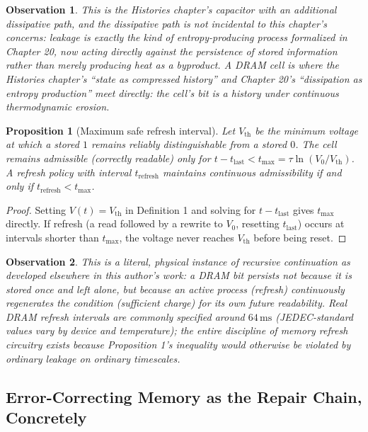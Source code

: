 \documentclass[12pt]{article}
\newtheorem{proposition}{Proposition}
\newtheorem{observation}{Observation}
\begin{document}
\begin{observation}
This is the Histories chapter's capacitor with an additional dissipative path, and the dissipative path is not incidental to this chapter's concerns: leakage is exactly the kind of entropy-producing process formalized in Chapter 20, now acting directly against the persistence of stored information rather than merely producing heat as a byproduct. A DRAM cell is where the Histories chapter's ``state as compressed history'' and Chapter 20's ``dissipation as entropy production'' meet directly: the cell's bit is a history under continuous thermodynamic erosion.
\end{observation}

\begin{proposition}[Maximum safe refresh interval]
Let $V_{\text{th}}$ be the minimum voltage at which a stored $1$ remains reliably distinguishable from a stored $0$. The cell remains admissible (correctly readable) only for $t - t_{\text{last}} < t_{\max} = \tau \ln(V_0/V_{\text{th}})$. A refresh policy with interval $t_{\text{refresh}}$ maintains continuous admissibility if and only if $t_{\text{refresh}} < t_{\max}$.
\end{proposition}

\begin{proof}
Setting $V(t) = V_{\text{th}}$ in Definition 1 and solving for $t - t_{\text{last}}$ gives $t_{\max}$ directly. If refresh (a read followed by a rewrite to $V_0$, resetting $t_{\text{last}}$) occurs at intervals shorter than $t_{\max}$, the voltage never reaches $V_{\text{th}}$ before being reset.
\end{proof}

\begin{observation}
This is a literal, physical instance of recursive continuation as developed elsewhere in this author's work: a DRAM bit persists not because it is stored once and left alone, but because an active process (refresh) continuously regenerates the condition (sufficient charge) for its own future readability. Real DRAM refresh intervals are commonly specified around $64\,\text{ms}$ (JEDEC-standard values vary by device and temperature); the entire discipline of memory refresh circuitry exists because Proposition 1's inequality would otherwise be violated by ordinary leakage on ordinary timescales.
\end{observation}

\subsection{Error-Correcting Memory as the Repair Chain, Concretely}
\end{document}

